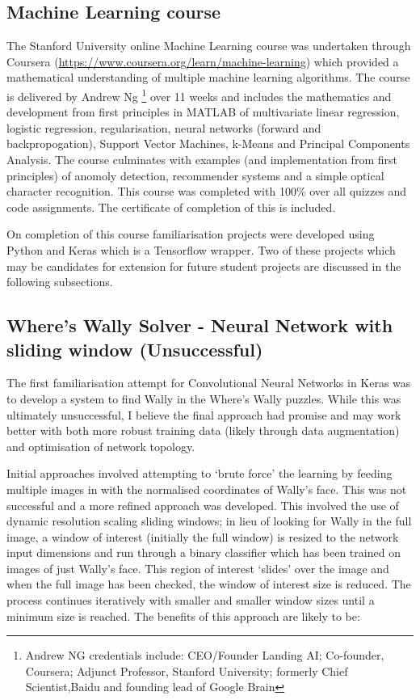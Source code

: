 \documentclass{article}
\begin{document}
\subsection{Machine Learning course}

The Stanford University online Machine Learning course was undertaken through Coursera (\url{https://www.coursera.org/learn/machine-learning}) which provided a mathematical understanding of multiple machine learning algorithms. The course is delivered by Andrew Ng \footnote{Andrew NG credentials include: CEO/Founder Landing AI; Co-founder, Coursera; Adjunct Professor, Stanford University; formerly Chief Scientist,Baidu and founding lead of Google Brain} over 11 weeks and includes the mathematics and development from first principles in MATLAB of multivariate linear regression, logistic regression, regularisation, neural networks (forward and backpropogation), Support Vector Machines, k-Means and Principal Components Analysis. The course culminates with examples (and implementation from first principles) of anomoly detection, recommender systems and a simple optical character recognition. This course was completed with 100\% over all quizzes and code assignments. The certificate of completion of this is included. 

On completion of this course familiarisation projects were developed using Python and Keras which is a Tensorflow wrapper. Two of these projects which may be candidates for extension for future student projects are discussed in the following subsections.


\subsection{Where's Wally Solver - Neural Network with sliding window (Unsuccessful)}

The first familiarisation attempt for Convolutional Neural Networks in Keras was to develop a system to find Wally in the Where's Wally puzzles. While this was ultimately unsuccessful, I believe the final approach had promise and may work better with both more robust training data (likely through data augmentation) and optimisation of network topology. 

Initial approaches involved attempting to `brute force' the learning by feeding multiple images in with the normalised coordinates of Wally's face. This was not successful and a more refined approach was developed. This involved the use of dynamic resolution scaling sliding windows; in lieu of looking for Wally in the full image, a window of interest (initially the full window) is resized to the network input dimensions and run through a binary classifier which has been trained on images of just Wally's face. This region of interest `slides' over the image and when the full image has been checked, the window of interest size is reduced. The process continues iteratively with smaller and smaller window sizes until a minimum size is reached. The benefits of this approach are likely to be:
\end{document}
